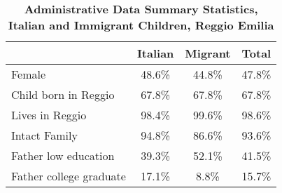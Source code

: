 \documentclass{article}
\begin{document}
\begin{table}[!ht]
\caption{\textbf{Administrative Data Summary Statistics, Italian and Immigrant Children, Reggio Emilia}}
\label{tab:AdminSum}
\begin{center}

\begin{tabular}{l*{3}{c}} \hline\hline
             &     \textbf{Italian}  &     \textbf{Migrant}  &       \textbf{Total}\\
\hline
Female       &       48.6\%  &       44.8\%  &       47.8\%\\
Child born in Reggio  &       67.8\%  &       67.8\%  &       67.8\% \\
Lives in Reggio  &       98.4\%  &       99.6\%  &       98.6\%\\
Intact Family  &       94.8\%  &       86.6\%  &       93.6\%\\
Father low education  &       39.3\%  &       52.1\%  &       41.5\%\\
Father college graduate  &       17.1\%  &      8.8\% &       15.7\%\\

\end{tabular}
\end{center}
\end{table}
\end{document}
